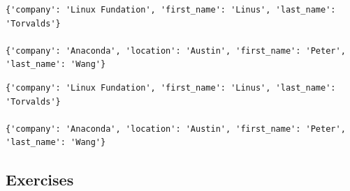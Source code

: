\documentclass[10pt]{book}
\begin{document}
\label{org6de950d}
\begin{verbatim}
{'company': 'Linux Fundation', 'first_name': 'Linus', 'last_name': 'Torvalds'}

{'company': 'Anaconda', 'location': 'Austin', 'first_name': 'Peter', 'last_name': 'Wang'}
\end{verbatim}

\label{org7b494e2}
\begin{verbatim}
{'company': 'Linux Fundation', 'first_name': 'Linus', 'last_name': 'Torvalds'}

{'company': 'Anaconda', 'location': 'Austin', 'first_name': 'Peter', 'last_name': 'Wang'}
\end{verbatim}
\subsection{Exercises}
\label{sec:org517bb15}
\end{document}
